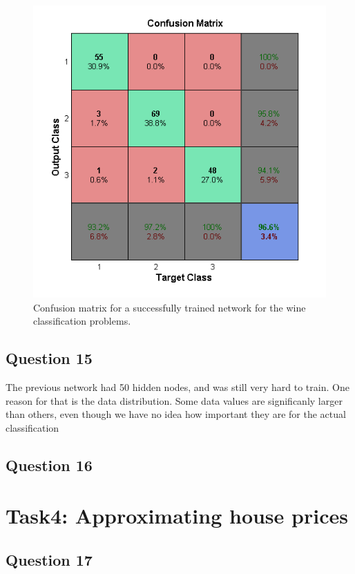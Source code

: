 \documentclass[a4paper]{article}
\begin{document}
\begin{figure}[h!] %
    \includegraphics[]{wine_classification.png}
    \caption{\label{fig:wine_classification}Confusion matrix for a successfully trained network for the wine classification problems.}
\end{figure}

\subsection*{Question 15}
The previous network had 50 hidden nodes, and was still very hard to train. One reason 
for that is the data distribution. Some data values are significanly larger than others,
even though we have no idea how important they are for the actual classification

\subsection*{Question 16}

\section{Task4: Approximating house prices}

\subsection*{Question 17}
\end{document}
